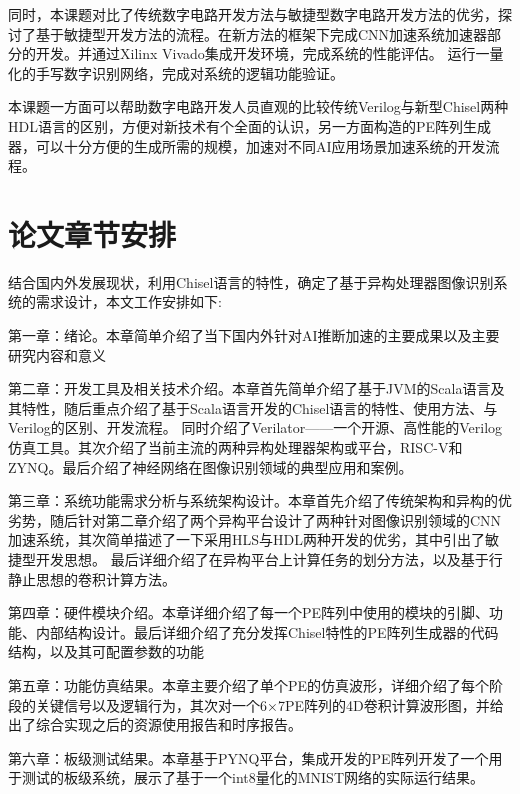     同时，本课题对比了传统数字电路开发方法与敏捷型数字电路开发方法的优劣，探讨了基于敏捷型开发方法的流程。在新方法的框架下完成CNN加速系统加速器部分的开发。并通过Xilinx Vivado集成开发环境，完成系统的性能评估。
    运行一量化的手写数字识别网络，完成对系统的逻辑功能验证。

    本课题一方面可以帮助数字电路开发人员直观的比较传统Verilog与新型Chisel两种HDL语言的区别，方便对新技术有个全面的认识，另一方面构造的PE阵列生成器，可以十分方便的生成所需的规模，加速对不同AI应用场景加速系统的开发流程。

\section{论文章节安排}
    结合国内外发展现状，利用Chisel语言的特性，确定了基于异构处理器图像识别系统的需求设计，本文工作安排如下:

    第一章：绪论。本章简单介绍了当下国内外针对AI推断加速的主要成果以及主要研究内容和意义

    第二章：开发工具及相关技术介绍。本章首先简单介绍了基于JVM的Scala语言及其特性，随后重点介绍了基于Scala语言开发的Chisel语言的特性、使用方法、与Verilog的区别、开发流程。
    同时介绍了Verilator——一个开源、高性能的Verilog仿真工具。其次介绍了当前主流的两种异构处理器架构或平台，RISC-V和ZYNQ。最后介绍了神经网络在图像识别领域的典型应用和案例。

    第三章：系统功能需求分析与系统架构设计。本章首先介绍了传统架构和异构的优劣势，随后针对第二章介绍了两个异构平台设计了两种针对图像识别领域的CNN加速系统，其次简单描述了一下采用HLS与HDL两种开发的优劣，其中引出了敏捷型开发思想。
    最后详细介绍了在异构平台上计算任务的划分方法，以及基于行静止思想的卷积计算方法。
    
    第四章：硬件模块介绍。本章详细介绍了每一个PE阵列中使用的模块的引脚、功能、内部结构设计。最后详细介绍了充分发挥Chisel特性的PE阵列生成器的代码结构，以及其可配置参数的功能

    第五章：功能仿真结果。本章主要介绍了单个PE的仿真波形，详细介绍了每个阶段的关键信号以及逻辑行为，其次对一个6×7PE阵列的4D卷积计算波形图，并给出了综合实现之后的资源使用报告和时序报告。

    第六章：板级测试结果。本章基于PYNQ平台，集成开发的PE阵列开发了一个用于测试的板级系统，展示了基于一个int8量化的MNIST网络的实际运行结果。


